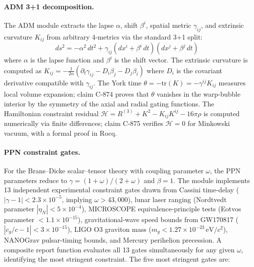 \documentclass[12pt,openany]{report}
\theoremstyle{definition}
\theoremstyle{plain}
\theoremstyle{remark}
\begin{document}
\paragraph{ADM 3+1 decomposition.}
The ADM module extracts the lapse $\alpha$, shift $\beta^i$, spatial
metric $\gamma_{ij}$, and extrinsic curvature $K_{ij}$ from arbitrary
4-metrics via the standard 3+1 split:
\begin{equation}
  ds^2 = -\alpha^2\,dt^2 + \gamma_{ij}(dx^i + \beta^i\,dt)(dx^j + \beta^j\,dt)
  \label{eq:adm}
\end{equation}
where $\alpha$ is the lapse function and $\beta^i$ is the shift vector.
The extrinsic curvature is computed as
$K_{ij} = -\frac{1}{2\alpha}(\partial_t \gamma_{ij} - D_i \beta_j - D_j \beta_i)$
where $D_i$ is the covariant derivative compatible with $\gamma_{ij}$.
The York time $\theta = -\mathrm{tr}(K) = -\gamma^{ij}K_{ij}$ measures
local volume expansion; claim C-874 proves that $\theta$ vanishes in the
warp-bubble interior by the symmetry of the axial and radial gating
functions.  The Hamiltonian constraint residual
$\mathcal{H} = R^{(3)} + K^2 - K_{ij}K^{ij} - 16\pi\rho$ is
computed numerically via finite differences; claim C-875 verifies
$\mathcal{H} = 0$ for Minkowski vacuum, with a formal proof in Rocq.

\paragraph{PPN constraint gates.}
For the Brans--Dicke scalar--tensor theory \cite{BransDicke1961}
with coupling parameter $\omega$, the PPN parameters reduce to
$\gamma = (1 + \omega)/(2 + \omega)$ and $\beta = 1$.  The module
implements 13 independent experimental constraint gates drawn from
Cassini time-delay ($|\gamma - 1| < 2.3 \times 10^{-5}$, implying
$\omega > 43{,}000$), lunar laser ranging (Nordtvedt parameter
$|\eta_N| < 5 \times 10^{-4}$), MICROSCOPE equivalence-principle
tests (Eotvos parameter $< 1.1 \times 10^{-15}$), gravitational-wave
speed bounds from GW170817 ($|c_g/c - 1| < 3 \times 10^{-15}$),
LIGO O3 graviton mass ($m_g < 1.27 \times 10^{-23}\,\mathrm{eV}/c^2$),
NANOGrav pulsar-timing bounds, and Mercury perihelion precession.
A composite report function evaluates all 13 gates simultaneously for
any given $\omega$, identifying the most stringent constraint.
The five most stringent gates are:
\end{document}
